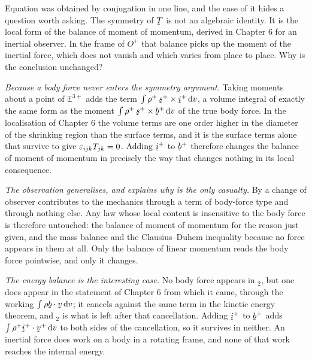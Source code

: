 \begin{remark}\label{rem:ch7symT}
Equation  was obtained by conjugation in one line, and the ease
of it hides a question worth asking. The symmetry of $\bT$ is not an
algebraic identity. It is the local form of the balance of moment of
momentum, derived in Chapter 6 for an inertial observer. In the frame of
$O^{+}$ that balance picks up the moment of the inertial force, which
does not vanish and which varies from place to place. Why is the
conclusion unchanged?

\emph{Because a body force never enters the symmetry argument.} Taking
moments about a point of $\mathbb{E}^{3+}$ adds the term
$\int\rho^{+}\,\bs^{+}\times\vek{i}^{+}\,\dl v$, a volume integral of
exactly the same form as the moment
$\int\rho^{+}\,\bs^{+}\times\bb^{+}\,\dl v$ of the true body force. In
the localisation of Chapter 6 the volume terms are one order higher in
the diameter of the shrinking region than the surface terms, and it is
the surface terms alone that survive to give $\varepsilon_{ijk}T_{jk}=0$. Adding
$\vek{i}^{+}$ to $\bb^{+}$ therefore changes the balance of moment of
momentum in precisely the way that changes nothing in its local
consequence.

\emph{The observation generalises, and explains why  is the
only casualty.} By  a change of observer contributes to the
mechanics through a term of body-force type and through nothing else. Any
law whose local content is insensitive to the body force is therefore
untouched: the balance of moment of momentum for the reason just given,
and the mass balance and the Clausius--Duhem inequality because no force
appears in them at all. Only the balance of linear momentum reads the
body force pointwise, and only it changes.

\emph{The energy balance is the interesting case.} No body force appears
in $_{2}$, but one does appear in the statement of Chapter 6
from which it came, through the working $\int\rho\ip\bb\bv\,\dl v$; it
cancels against the same term in the kinetic energy theorem, and
$_{2}$ is what is left after that cancellation. Adding
$\vek{i}^{+}$ to $\bb^{+}$ adds
$\int\rho^{+}\ip{\vek{i}^{+}}{\bv^{+}}\,\dl v$ to both sides of the
cancellation, so it survives in neither. An inertial force does work on a
body in a rotating frame, and none of that work reaches the internal
energy.


\end{remark}
